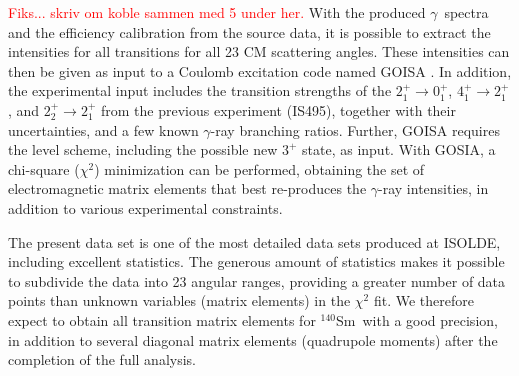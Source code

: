\documentclass[twoside,english]{uiofysmaster/uiofysmaster}
\newcommand{\Sm}{$^{140}$Sm} %
\newcommand{\ga}{$\gamma$}
\begin{document}
\textcolor{red}{Fiks... skriv om koble sammen med 5 under her.}\newline
With the produced \ga\ spectra and the efficiency calibration from the source data, it is possible to extract the intensities for all transitions for all 23 CM scattering angles. 
These intensities can then be given as input to a Coulomb excitation code named GOISA \cite{GOSIA}. 
In addition, the experimental input includes the transition strengths of the $2_1^+ \rightarrow 0_1^+$, $4_1^+ \rightarrow 2_1^+$, and $2_2^+ \rightarrow 2_1^+$ from the previous experiment (IS495), together with their uncertainties, and a few known \ga-ray branching ratios. 
Further, GOISA requires the level scheme, including the possible new $3^+$ state, as input. 
With GOSIA, a chi-square ($\chi^2$) minimization can be performed, obtaining the set of electromagnetic matrix elements that best re-produces the \ga-ray intensities, in addition to various experimental constraints.

The present data set is one of the most detailed data sets produced at ISOLDE, including excellent statistics. 
The generous amount of statistics makes it possible to subdivide the data into 23 angular ranges, providing a greater number of data points than unknown variables (matrix elements) in the $\chi^2$ fit.
We therefore expect to obtain all transition matrix elements for \Sm\ with a good precision, in addition to several diagonal matrix elements (quadrupole moments) after the completion of the full analysis.





%	


\end{document}
